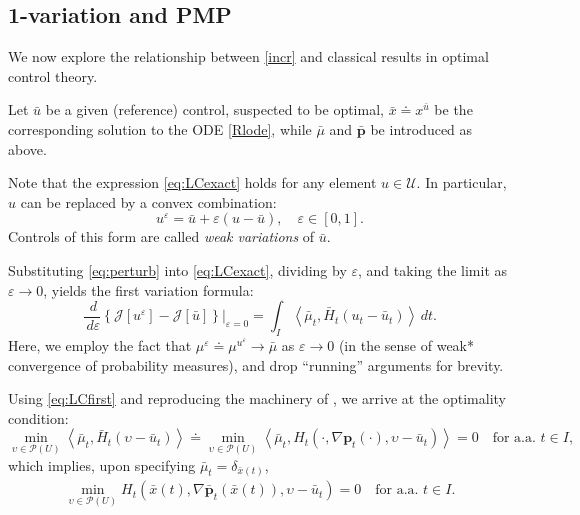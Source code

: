 \documentclass[sn-mathphys-num]{sn-jnl}
\numberwithin{equation}{section}
\theoremstyle{mythm}
\theoremstyle{mydef}
\renewcommand{\epsilon}{\varepsilon}
\renewcommand{\d}{\,d}
\begin{document}
\subsection{1-variation and PMP}\label{sec:pmp-c}


We now explore the relationship between \eqref{incr} and classical results in optimal control theory.

Let $\bar{u}$ be a given (reference) control, suspected to be optimal, $\bar x \doteq x^{\bar u}$ be the corresponding solution to the ODE \eqref{Rlode}, while $\bar \mu$ and $\bar{\bm p}$ be introduced as above. 

Note that the expression \eqref{eq:LCexact} holds for any element $u \in \mathcal{U}$. In particular, $u$ can be replaced by a convex combination:  
\begin{equation}
    \label{eq:perturb}
    u^\varepsilon = \bar{u} + \epsilon (u - \bar{u}), \quad \epsilon \in [0,1].  
\end{equation}
Controls of this form are called \emph{weak variations} of $\bar u$.  

Substituting \eqref{eq:perturb} into \eqref{eq:LCexact}, dividing by $\varepsilon$, and taking the limit as $\epsilon \to 0$, yields the first variation formula:
\begin{equation}
    \label{eq:LCfirst}
    \frac{\d}{\d \epsilon} \left\{ \mathcal{J}[u^\varepsilon] - \mathcal{J}[\bar{u}] \right\} \Big|_{\varepsilon = 0} =
    \int_I \left\langle \bar{\mu}_t, \bar{H}_t(u_t - \bar{u}_t) \right\rangle \d t.
\end{equation}
Here, we employ the fact that \( \mu^\varepsilon \doteq \mu^{u^\varepsilon} \to \bar{\mu} \) as \( \varepsilon \to 0 \) (in the sense of weak* convergence of probability measures), and drop ``running'' arguments for brevity. 

Using \eqref{eq:LCfirst} and reproducing the machinery of \cite{Pogodaev2018}, we arrive at the optimality condition:
\[
  \min_{\upsilon \in \mathcal{P}(U)} \left\langle \bar{\mu}_t, \bar{H}_t(\upsilon - \bar{u}_t) \right\rangle \doteq \min_{\upsilon \in \mathcal{P}(U)} \left\langle \bar{\mu}_t, H_t(\cdot, \nabla \bm{p}_t(\cdot), \upsilon - \bar{u}_t) \right\rangle = 0 \quad \text{for a.a. } t \in I,
\]
which implies, upon specifying \( \bar{\mu}_t = \delta_{\bar{x}(t)} \),
\begin{gather}
\label{SPMP}
  \min_{\upsilon \in \mathcal{P}(U)} H_t\left(\bar{x}(t), \nabla \bar{\bm{p}}_t(\bar{x}(t)), \upsilon - \bar{u}_t \right) = 0 \quad \text{for a.a. } t \in I.
\end{gather}
\end{document}
